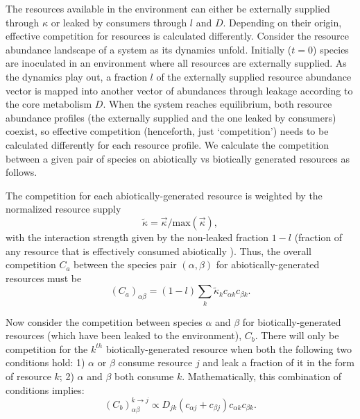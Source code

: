 \documentclass[12pt]{article}
\begin{document}
The resources available in the environment can either be externally supplied through $\kappa$ or leaked by consumers through $l$ and $D$. Depending on their origin, effective competition for resources is calculated differently. Consider the resource abundance landscape of a system as its dynamics unfold. Initially ($t = 0$) species are inoculated in an environment where all resources are externally supplied. As the dynamics play out, a fraction $l$ of the externally supplied resource abundance vector is mapped into another vector of abundances through leakage according to the core metabolism $D$. When the system reaches equilibrium, both resource abundance profiles (the externally supplied and the one leaked by consumers) coexist, so effective competition (henceforth, just `competition') needs to be calculated differently for each resource profile. We calculate the competition  between a given pair of species on abiotically vs biotically generated resources as follows.

The competition for each abiotically-generated resource is weighted by the normalized resource supply 
$$\tilde{\kappa} = \vec{\kappa}/\text{max}(\vec{\kappa}),$$
with the interaction strength given by the non-leaked fraction $1 - l$ (fraction of any resource that is effectively consumed abiotically ). Thus, the overall competition $C_a$ between the species pair $(\alpha, \beta)$ for abiotically-generated resources  must be
\begin{equation}\label{eq:abiotic}
	(C_a)_{\alpha\beta} = (1-l) \sum_k \tilde{\kappa}_kc_{\alpha k}c_{\beta k}.
\end{equation}

Now consider the competition between species $\alpha$ and $\beta$ for biotically-generated resources (which have been leaked to the environment), $C_b$. There will only be competition for the $k^{th}$ biotically-generated resource when both the following two conditions hold: 1) $\alpha$ or $\beta$ consume resource $j$ and leak a fraction of it in the form of resource $k$; 2) $\alpha$ and $\beta$ both consume $k$. Mathematically, this combination of conditions implies:
\begin{equation}\label{eq:little_biotic_term}
    (C_b)^{k\rightarrow j}_{\alpha \beta} \propto D_{jk}\left(c_{\alpha j} + c_{\beta j}\right)c_{\alpha k}c_{\beta k}.
\end{equation}
\end{document}
